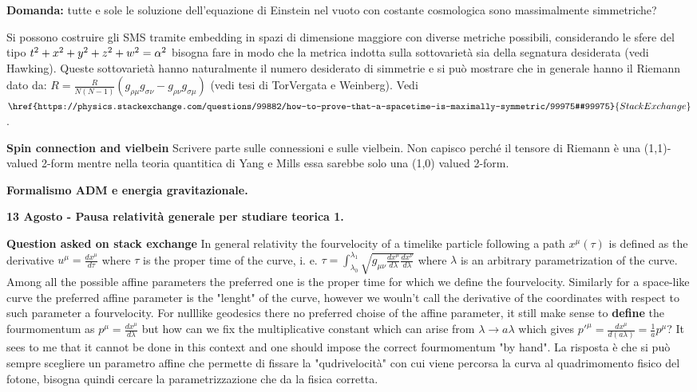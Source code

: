 \documentclass[10pt,a4paper]{article}
\begin{document}
\textbf{Domanda:} tutte e sole le soluzione dell'equazione di Einstein nel vuoto con costante cosmologica sono massimalmente simmetriche?

Si possono costruire gli SMS tramite embedding in spazi di dimensione maggiore con diverse metriche possibili, considerando le sfere del tipo $\-t^2+x^2+y^2+z^2+w^2 = \alpha^2$ bisogna fare in modo che la metrica indotta sulla sottovarietà sia della segnatura desiderata (vedi Hawking). Queste sottovarietà hanno naturalmente il numero desiderato di simmetrie e si può mostrare che in generale hanno il Riemann dato da: $R = \frac{R}{N(N-1)} (g_{\rho \mu} g_{\sigma \nu} - g_{\rho \nu} g_{\sigma \mu})$ (vedi tesi di TorVergata e Weinberg). Vedi $\href{https://physics.stackexchange.com/questions/99882/how-to-prove-that-a-spacetime-is-maximally-symmetric/99975#99975}{StackExchange}$.

\textbf{Spin connection and vielbein}
Scrivere parte sulle connessioni e sulle vielbein. Non capisco perché il tensore di Riemann è una (1,1)-valued 2-form mentre nella teoria quantitica di Yang e Mills essa sarebbe solo una (1,0) valued 2-form.

\textbf{Formalismo ADM e energia gravitazionale.}

\textbf{13 Agosto - Pausa relatività generale per studiare teorica 1.}

\textbf{Question asked on stack exchange}
In general relativity the fourvelocity of a timelike particle following a path $x^{\mu}(\tau)$ is defined as the derivative $u^{\mu} = \frac{dx^{\mu}}{d \tau}$ where $\tau$ is the proper time of the curve, i. e. $\tau = \int_{\lambda_0}^{\lambda_1} \sqrt{g_{\mu \nu} \frac{dx^{\mu}}{d \lambda} \frac{dx^{\nu}}{d \lambda}}$ where $\lambda$ is an arbitrary parametrization of the curve. Among all the possible affine parameters the preferred one is the proper time for which we define the fourvelocity. Similarly for a space-like curve the preferred affine parameter is the "lenght" of the curve, however we wouln't call the derivative of the coordinates with respect to such parameter a fourvelocity. For nulllike geodesics there no preferred choise of the affine parameter, it still make sense to \textbf{define} the fourmomentum as $p^{\mu} = \frac{dx^{\mu}}{d \lambda}$ but how can we fix the multiplicative constant which can arise from $\lambda \rightarrow a \lambda$ which gives $p'^{\mu} = \frac{dx^{\mu}}{d (a \lambda)} = \frac{1}{a} p^{\mu}$? It sees to me that it cannot be done in this context and one should impose the correct fourmomentum "by hand".
La risposta è che si può sempre scegliere un parametro affine che permette di fissare la "qudrivelocità" con cui viene percorsa la curva al quadrimomento fisico del fotone, bisogna quindi cercare la parametrizzazione che da la fisica corretta.
\end{document}
